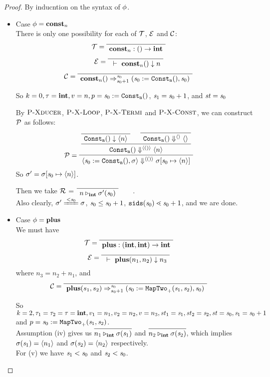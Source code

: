 \begin{proof}
By inducntion on the syntax of $\phi$.
\begin{itemize}
	\item \label{thm-case-const} Case $\phi = \mathbf{const}_{n}$ \\ 	
	There is only one possibility for each of $\mathcal{T}$, $\mathcal{E}$ and $\mathcal{C}$:
	$$\MT = \PT{ \Axiom{\Typef{\constn{n}}{}{\int}}}$$
	$$\ME = \PT{\Axiom{\Eval{}{\const{n}}{n}}}$$
	$$\MC = \PT{\Axiom{\Transf{\constn{n}}{}{\s_0}{\s_0+1}
			{\sfun{\sdef{\s_0}{\constaf{n}}}{\s_0}}}}$$

\def\pconst{\sdef{\s_0}{\constaf{n}}}
	So $k=0,\tau = \int, v = n, p = \pconst$, $\mathit{s}_1 = \mathit{s}_0+1$, and $\mathit{st} = \mathit{s}_0$

	By $\textsc{P-Xducer}$, $\textsc{P-X-Loop}$, $\textsc{P-X-Termi}$ and $\textsc{P-X-Const}$, we can construct $\mathcal{P}$ as follows:
	$$\PT{
		\Axiom{\blockf{\consta{n}}{}{\singl{n}}}
		\Axiom{\sevalfg{\consta{n}}{}{\emptyv}{\emptyv}}
		\BC{\sevalfg{\consta{n}}{}{\vunit}{\singl{n}}}
		\LeLa{\MP = }
		\UC{\seval{\pconst}{\sgm}{\vunit}{\sgm[\s_0 \|-> \singl{n}]}}			
	}$$
	So $\sgm' = \sgm[\s_0 \|-> \singl{n}]$.
	
	Then we take $\mathcal{R}$ = $\PT{\Axiom{\ValRep{n}{\int}{\sgm'(\s_0)}}}$. \\
	Also clearly, $\sgm' \ConEq{\s_0} \sgm$, $\mathit{s}_0 \le \mathit{s}_0 +1$, 
	$\sids{\s_0} \.< \s_0 +1$, and we are done.
		
	\item \label{thm-case-plus} Case $\phi = \mathbf{plus}$ \\ 	
	We must have 
	$$\MT = \PT{\Axiom{\Typef{\plusn}{\int,\int}{\int}}}$$
	$$\ME = \PT{\Axiom{\Eval{}{\plus{n_1}{n_2}}{n_3}}}$$ where $n_3 = n_2 + n_1$, and 
	$$\MC = \PT{\Axiom{\Transf{\plusn}{s_1,s_2}{\s_0}{s_0+1}
			{\sfun{\sdef{\s_0}{\maptwof{+}{\s_1}{\s_2}}}}{\s_0}}}$$

\def\pplus{\sdef{\s_0}{\maptwof{+}{\s_1}{\s_2}}}	
	So $k=2,\tau_1 = \tau_2 = \tau = \mathbf{int}, v_1= n_1, v_2= n_2, v = n_3,
	 \mathit{st}_1= \mathit{s}_1, \mathit{st}_2 = \mathit{s}_2, \mathit{st} = \mathit{s}_0, \mathit{s}_1 = \mathit{s}_0 +1$
	 and $p = \pplus$. \\
	 
	 Assumption (iv) gives us
	 $\infer{\ValRep{n_1}{\int}{\sgm(\s_1)}}{}$ and 
	 $\infer{\ValRep{n_2}{\int}{\sgm(\s_2)}}{}$, which implies
	 $\sigma(\mathit{s}_1) = \langle n_1 \rangle$ and $\sigma(\mathit{s}_2) = \langle n_2 \rangle$ respectively. \\
	 
	 For (v) we have $\mathit{s}_1 < \mathit{s}_0$ and $\mathit{s}_2 < \mathit{s}_0$. \\
	 

\end{itemize}
\end{proof}
